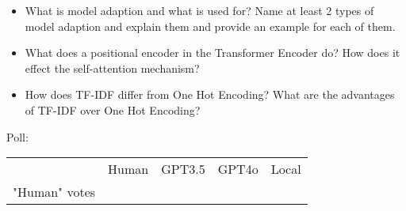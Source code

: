 {\begin{tcolorbox}[skin=widget,
    	coltitle=black,
    	colframe=s-group3!30,
    	colback=s-group3!10,
    	fontupper=\tiny,
    	adjusted title=Group 3,
    	boxrule=2mm]
\begin{itemize}
    	\end{itemize}
    \end{tcolorbox}
       	
     \begin{tcolorbox}[skin=widget,
    	coltitle=black,
    	colframe=s-group4!30,
    	colback=s-group4!10,
    	fontupper=\tiny,
    	adjusted title=Group 4,
    	boxrule=2mm]
    	\begin{itemize}
    		\setlength\itemsep{-0.2em}
    		\item What is model adaption and what is used for? Name at least 2 types of model adaption and explain them and provide an example for each of them.
    		\item What does a positional encoder in the Transformer Encoder do? How does it effect the self-attention mechanism?
    		\item How does TF-IDF differ from One Hot Encoding? What are the advantages of TF-IDF over One Hot Encoding?

    	\end{itemize}
    \end{tcolorbox}
    
	\vspace*{0.5cm}
	Poll:
	\vspace*{-1.5cm}
    \begin{tikztable}
	\begin{tabularx}{17.5cm}{Y|Y|Y|Y|Y}
		& Human   &  GPT3.5  & GPT4o  & Local \\[5pt]
		"Human" votes &&&& \\
	\end{tabularx}
    \end{tikztable}
}

